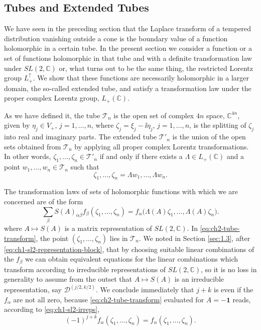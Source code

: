 \subsection{Tubes and Extended Tubes}\label{sec:2.4}

We have seen in the preceding section that the Laplace transform of a tempered
distribution vanishing outside a cone is the boundary value of a function
holomorphic in a certain tube.  In the present section we consider a function or
a set of functions holomorphic in that tube and with a definite transformation
law under $SL(2,\mathbb C)$ or, what turns out to be the same thing, the
restricted Lorentz group $L^{\uparrow}_{+}$.  We show that these functions are
necessarily holomorphic in a larger domain, the so-called extended tube, and
satisfy a transformation law under the proper complex Lorentz group,
$L_{+}(\mathbb C)$.

As we have defined it, the tube $\mathcal{T}_{n}$ is the open set of complex
$4n$ space, $\mathbb C^{4n}$, given by $\eta_j\in V_{+}$, $j=1,\ldots,n$,
where $\zeta_j=\xi_j-\ii\eta_j$, $j=1,\ldots,n$, is the splitting of $\zeta_j$
into real and imaginary parts.  The extended tube $\mathcal{T}'_{n}$ is the
union of the open sets obtained from $\mathcal{T}_{n}$ by applying all proper
complex Lorentz transformations.  In other words,
$\zeta_1,\ldots,\zeta_n\in\mathcal{T}'_{n}$ if and only if there exists a
$\Lambda\in L_{+}(\mathbb C)$ and a point
$w_1,\ldots,w_n\in\mathcal{T}_{n}$ such that
\begin{equation*}
  \zeta_1,\ldots,\zeta_n=\Lambda w_1,\ldots,\Lambda w_n .
\end{equation*}

The transformation laws of sets of holomorphic functions with which we are
concerned are of the form
\begin{equation}
  \sum_{\beta}S(A)_{\alpha\beta}
  f_{\beta}(\zeta_1,\ldots,\zeta_n)
  =f_{\alpha}\bigl(\Lambda(A)\zeta_1,\ldots,\Lambda(A)\zeta_n\bigr) .
  \tag{2-84}\label{eq:ch2-tube-transform}
\end{equation}
where $A\mapsto S(A)$ is a matrix representation of $SL(2,\mathbb C)$.  In
\eqref{eq:ch2-tube-transform}, the point $(\zeta_1,\ldots,\zeta_n)$ lies in $\mathcal{T}_{n}$.  We
noted in Section \ref{sec:1.3}, after \eqref{eq:ch1-sl2-representation-block}, that by choosing suitable linear
combinations of the $f_{\beta}$ we can obtain equivalent equations for the
linear combinations which transform according to irreducible representations of
$SL(2,\mathbb C)$, so it is no loss in generality to assume from the outset
that $A\mapsto S(A)$ is an irreducible representation, say
$\mathcal D^{(j/2,k/2)}$.  We conclude immediately that $j+k$ is even if the
$f_{\alpha}$ are not all zero, because \eqref{eq:ch2-tube-transform} evaluated for $A=-\mathbf{1}$
reads, according to \eqref{eq:ch1-sl2-irreps},
\begin{equation*}
  (-1)^{j+k}f_{\alpha}(\zeta_1,\ldots,\zeta_n)
  =f_{\alpha}(\zeta_1,\ldots,\zeta_n) .
\end{equation*}

